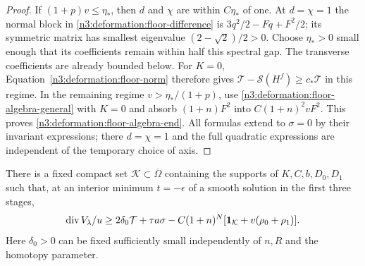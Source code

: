 \begin{proof}
If $(1+p)v\le\eta_*$, then $d$ and $\chi$ are within $C\eta_*$
of one. At $d=\chi=1$ the normal block in
\eqref{n3:deformation:floor-difference} is
$3q^2/2-Fq+F^2/2$; its symmetric matrix has smallest eigenvalue
$(2-\sqrt2)/2>0$.
Choose $\eta_*>0$ small enough that its coefficients remain within
half this spectral gap. The transverse coefficients are already
bounded below. For $K=0$, Equation~\eqref{n3:deformation:floor-norm}
therefore gives $\mathcal T-\mathcal S(H^f)\ge c_*\mathcal T$
in this regime.
In the remaining regime $v>\eta_* /(1+p)$, use
\eqref{n3:deformation:floor-algebra-general} with $K=0$ and absorb
$(1+n)F^2$ into $C(1+n)^2vF^2$.
This proves \eqref{n3:deformation:floor-algebra-end}.
All formulas extend to $\sigma=0$ by their invariant expressions;
there $d=\chi=1$ and the full quadratic expressions are independent of
the temporary choice of axis.
\end{proof}

\begin{lemma}
\label{n3:deformation:floor-errors}
There is a fixed compact set $\mathcal K\subset\overline\Omega$ containing
the supports of $K,C,b,D_0,D_1$ such that, at an interior minimum
$t=-\epsilon$ of a smooth solution in the first three stages,
\begin{equation}\label{n3:deformation:floor-divergence-lower}
 \operatorname{div} V_\lambda/u
 \ge 2\delta_0\mathcal T+\tau a\sigma
      -C(1+n)^N
       [\mathbf1_{\mathcal K}+v(\rho_0+\rho_1)].
\end{equation}
Here $\delta_0>0$ can be fixed sufficiently small independently of
$n,R$ and the homotopy parameter.
\end{lemma}

